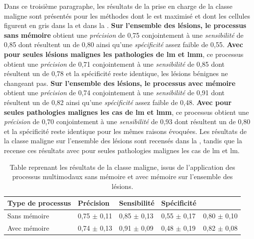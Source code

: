 Dans ce troisième paragraphe, les résultats de la prise en charge de la classe maligne sont présentés pour les méthodes dont le \fscore{} est maximisé et dont les cellules figurent en gris dans la  et dans la . \textbf{Sur l'ensemble des lésions, le \textbf{processus sans mémoire}} obtient une \textit{précision} de 0,75 conjointement à une \textit{sensibilité} de 0,85 dont résultent un \fscore{} de 0,80 ainsi qu'une \textit{spécificité} assez faible de 0,55. \textbf{Avec pour seules lésions malignes les pathologies de \gls{lm} et \gls{lmm}}, ce processus obtient une \textit{précision} de 0,71 conjointement à une \textit{sensibilité} de 0,85 dont résultent un \fscore{} de 0,78 et la spécificité reste identique, les lésions bénignes ne changeant pas. \textbf{Sur l'ensemble des lésions, le \textbf{processus avec mémoire}} obtient une \textit{précision} de 0,74 conjointement à une \textit{sensibilité} de 0,91 dont résultent un \fscore{} de 0,82 ainsi qu'une \textit{spécificité} assez faible de 0,48. \textbf{Avec pour seules pathologies malignes les cas de \gls{lm} et \gls{lmm}}, ce processus obtient une \textit{précision} de 0,70 conjointement à une \textit{sensibilité} de 0,93 dont résultent un \fscore{} de 0,80 et la spécificité reste identique pour les mêmes raisons évoquées. Les résultats de la classe maligne sur l'ensemble des lésions sont recensés dans la , tandis que la  recense ces résultats avec pour seules pathologies malignes les cas de \gls{lm} et \gls{lm}.\par

\begin{table}[H]
    \centering
    \begin{tabular}{lllll}
        \toprule 
        Type de processus   & Précision             & Sensibilité           & Spécificité           & \Fscore{}             \\ \midrule
        Sans mémoire        & 0,75 $\pm$ 0,11 	    & 0,85 $\pm$ 0,13 	    & 0,55 $\pm$ 0,17 	    & 0,80 $\pm$ 0,10         \\ \midrule
        Avec mémoire        & 0,74 $\pm$ 0,13 	    & 0,91 $\pm$ 0,09 	    & 0,48 $\pm$ 0,19 	    & 0,82 $\pm$ 0,08         \\ \bottomrule
    \end{tabular}
    \caption{Table reprenant les résultats de la classe maligne, issus de l'application des processus multimodaux sans mémoire et avec mémoire sur l'ensemble des lésions.}
    \label{tab:results_multimodal_process_malignant}
\end{table}

